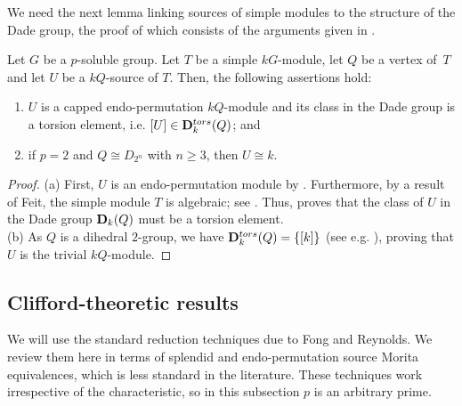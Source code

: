 \noindent We need the next lemma linking sources of simple modules to the structure of the Dade group, the proof of which consists of the arguments given in \cite[paragraph after Proposition~2.1]{CELK11}. 


\begin{lem}\label{lem:SourcesSimples_p_soluble_groups}\label{lem:sourcesSimpleDihedral}\label{lem:SourcesSimplesSolubleGroups}
Let $G$ be a $p$-soluble group. Let $T$ be a simple $kG$-module, let $Q$ be a vertex of~$T$ and let $U$ be a $kQ$-source of $T$.  Then, the following assertions hold:
    \begin{enumerate}[label={\rm(\alph*)}]
        \item $U$ is a capped endo-permutation $kQ$-module and its class in the Dade group is a torsion element, i.e. $[U]\in{\mathbf{D}}_k^{tors}(Q)$; and 
        \item if $p=2$ and  $Q\cong D_{2^n}$ with $n\geq 3$, then $U\cong k$. 
    \end{enumerate}
\end{lem}    
    
\begin{proof}    
    (a) First, $U$ is an endo-permutation module by \cite{PuigNilpotentBlocks88}. Furthermore, by a result of Feit, the simple module $T$ is algebraic; see \cite{Feit80}. Thus, \cite[Proposition~4.4]{BoltjeKuls06} proves that the class of $U$ in the Dade group ${\mathbf{D}}_k(Q)$ must be a torsion element.\\
    (b) As $Q$ is a dihedral $2$-group, we have  ${\mathbf{D}}_k^{tors}(Q)=\{[k]\}$ (see e.g. \cite[Proposition~6.4(d)]{ThevenazSurvey}), proving that $U$ is the trivial $kQ$-module. 
\end{proof}




\vspace{2mm}
\subsection{Clifford-theoretic results}

We will use the standard reduction techniques due to 
Fong and Reynolds. We review them here in terms of splendid and endo-permutation source Morita equivalences, which is less standard in the literature. These techniques work irrespective of the characteristic, so in this subsection $p$ is an arbitrary prime.


